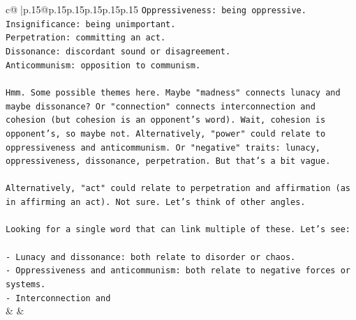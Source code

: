 \documentclass{article}
\begin{document}
{\begin{supertabular}{c@{$\;$}|p{.15\linewidth}@{}p{.15\linewidth}p{.15\linewidth}p{.15\linewidth}p{.15\linewidth}p{.15\linewidth}}
{{{\texttt{Oppressiveness: being oppressive.} \\
\texttt{Insignificance: being unimportant.} \\
\texttt{Perpetration: committing an act.} \\
\texttt{Dissonance: discordant sound or disagreement.} \\
\texttt{Anticommunism: opposition to communism.} \\
\\ 
\texttt{Hmm. Some possible themes here. Maybe "madness" connects lunacy and maybe dissonance? Or "connection" connects interconnection and cohesion (but cohesion is an opponent's word). Wait, cohesion is opponent's, so maybe not. Alternatively, "power" could relate to oppressiveness and anticommunism. Or "negative" traits: lunacy, oppressiveness, dissonance, perpetration. But that's a bit vague.} \\
\\ 
\texttt{Alternatively, "act" could relate to perpetration and affirmation (as in affirming an act). Not sure. Let's think of other angles.} \\
\\ 
\texttt{Looking for a single word that can link multiple of these. Let's see:} \\
\\ 
\texttt{{-} Lunacy and dissonance: both relate to disorder or chaos.} \\
\texttt{{-} Oppressiveness and anticommunism: both relate to negative forces or systems.} \\
\texttt{{-} Interconnection and} \\
            }
        }
    }
    & & \\ \\


\end{supertabular}}
\end{document}
